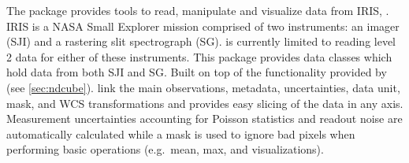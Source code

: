 The  package provides tools to read, manipulate and visualize data from IRIS, \citep{DePontieu2014}.
IRIS is a NASA Small Explorer mission comprised of two instruments: an imager (SJI) and a rastering slit spectrograph (SG).
 is currently limited to reading level 2 data for either of these instruments.
This package provides data classes which hold data from both SJI and SG.
Built on top of the functionality provided by  (see \autoref{sec:ndcube}).  link the main observations, metadata, uncertainties, data unit, mask, and WCS transformations and provides easy slicing of the data in any axis.
Measurement uncertainties accounting for Poisson statistics and readout noise are automatically calculated while a mask is used to ignore bad pixels when performing basic operations (e.g.\ mean, max, and visualizations).
